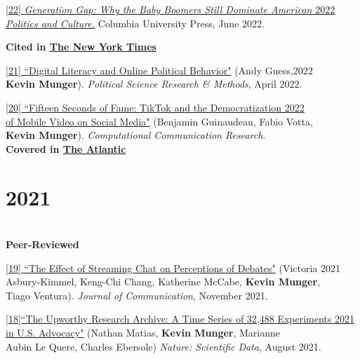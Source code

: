 \documentclass[margin]{res}
\begin{document}
\href{https://www.amazon.com/Generation-Gap-Dominate-American-Politics/dp/B08ZK7YV47/}{[22] \textit{Generation Gap: Why the Baby Boomers Still Dominate American} \hfill 2022\\ \textit{Politics and Culture.}} Columbia University Press, June 2022.\\
\footnotesize{\textbf{Cited in \href{https://www.nytimes.com/2022/06/29/opinion/progressive-nonprofits-philanthropy.html}{The New York Times}}
\normalsize


\href{https://www.cambridge.org/core/journals/political-science-research-and-methods/article/abs/digital-literacy-and-online-political-behavior/941391F2B600ED4543CF5586F19AE16E}{[21] ``Digital Literacy and Online Political Behavior"} (Andy Guess,\hfill 2022\\ \textbf{Kevin Munger}). \textit{Political Science Research \& Methods}, April 2022.


\href{https://osf.io/f7ehq/}{[20] ``Fifteen Seconds of Fame:  TikTok and the Democratization \hfill 2022\\ of Mobile Video on Social Media"} (Benjamin Guinaudeau, Fabio Votta,\\ \textbf{Kevin Munger}). \textit{Computational Communication Research}.\\
\footnotesize{\textbf{Covered in \href{https://newsletters.theatlantic.com/galaxy-brain/633bcd00b606fe0037669a3f/tiktok-politics-and-the-era-of-embodied-memes/}{The Atlantic}}}

\normalsize




\section{2021} 



\hfill\\
\textbf{Peer-Reviewed}



\href{https://academic.oup.com/joc/advance-article/doi/10.1093/joc/jqab041/6415947}{[19] ``The Effect of Streaming Chat on Perceptions of Debates"} (Victoria \hfill 2021\\ Asbury-Kimmel, Keng-Chi Chang, Katherine McCabe, \textbf{Kevin Munger},\\ Tiago Ventura). \textit{Journal of Communication}, November 2021.




\href{https://www.nature.com/articles/s41597-021-00934-7}{[18]``The Upworthy Research Archive: A Time Series of 32,488 Experiments \hfill 2021\\ in U.S. Advocacy"} (Nathan Matias, \textbf{Kevin Munger}, Marianne \\Aubin Le Quere, Charles Ebersole) \textit{Nature: Scientific Data}, August 2021.



}
\end{document}
